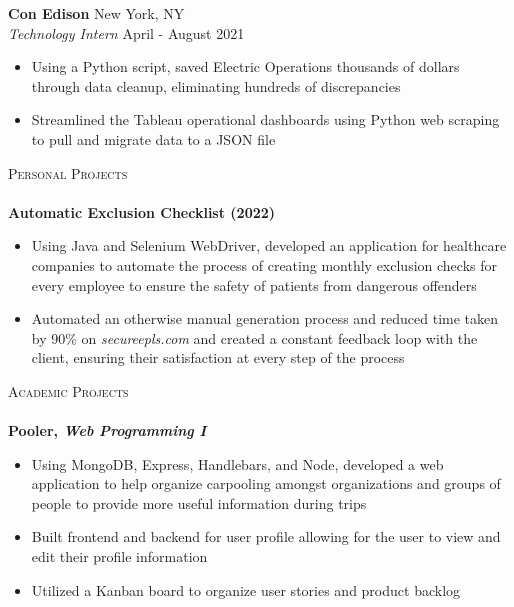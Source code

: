 \documentclass[10pt]{article}
\newcommand{\lineunder} {
    \vspace*{-8pt} \\
    \hspace*{-18pt} \hrulefill \\
}
\newcommand{\header} [1] {
    {\hspace*{-18pt}\vspace*{6pt} \textsc{#1}}
    \vspace*{-6pt} \lineunder
}
\begin{document}
\textbf{Con Edison} \hfill New York, NY\\
\textit{Technology Intern} \hfill April - August 2021\\
\vspace{-1mm}
\begin{itemize}[noitemsep,parsep=0pt,partopsep=0pt]\itemsep 1pt
    \item Using a Python script, saved Electric Operations thousands of dollars through data cleanup, eliminating hundreds of discrepancies
    \item Streamlined the Tableau operational dashboards using Python web scraping to pull and migrate data to a JSON file
\end{itemize}
\vspace{2mm}
\header{Personal Projects}
{\textbf{Automatic Exclusion Checklist (2022)}}
\begin{itemize}[noitemsep,topsep=0.5pt, parsep=0pt,partopsep=0pt]
    \item Using Java and Selenium WebDriver, developed an application for healthcare companies to automate the process of creating monthly exclusion checks for every employee to ensure the safety of patients from dangerous offenders
    \item Automated an otherwise manual generation process and reduced time taken by 90\% on \textit{secureepls.com} and created a constant feedback loop with the client, ensuring their satisfaction at every step of the process
\end{itemize}
\vspace{2mm}
\header{Academic Projects}
\textbf{Pooler, \textit{Web Programming I}}
\begin{itemize}[noitemsep, topsep=0.5pt, parsep=0pt,partopsep=0pt]
    \item Using MongoDB, Express, Handlebars, and Node, developed a web application to help organize carpooling amongst organizations and groups of people to provide more useful information during trips
    \item Built frontend and backend for user profile allowing for the user to view and edit their profile information
    \item Utilized a Kanban board to organize user stories and product backlog
\end{itemize}
\end{document}
